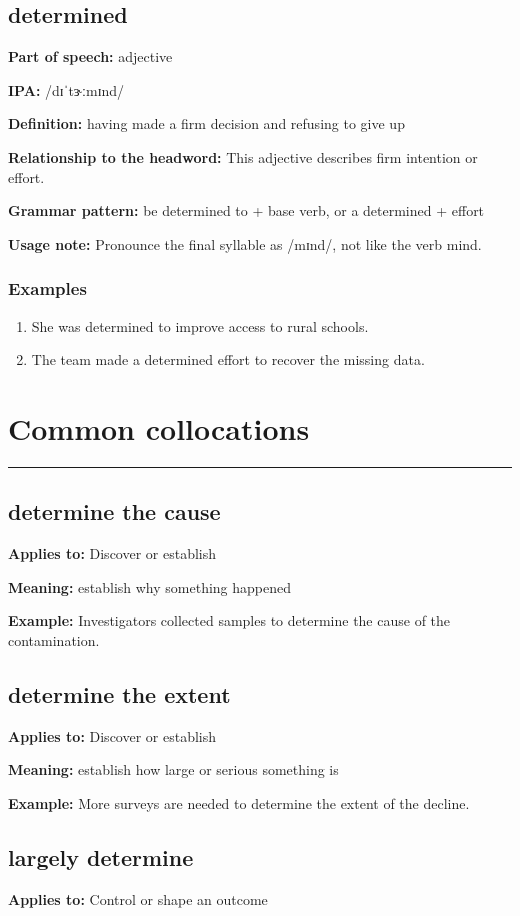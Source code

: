 \documentclass[11pt]{article}
\newcommand{\sectionrule}{\par\vspace{-0.5em}\noindent\textcolor{Accent}{\rule{\linewidth}{0.6pt}}\par}
\begin{document}
\subsection{determined}
\textbf{Part of speech:} adjective

\textbf{IPA:} /dɪˈtɝːmɪnd/

\textbf{Definition:} having made a firm decision and refusing to give up

\textbf{Relationship to the headword:} This adjective describes firm intention or effort.

\textbf{Grammar pattern:} be determined to + base verb, or a determined + effort

\textbf{Usage note:} Pronounce the final syllable as /mɪnd/, not like the verb mind.

\subsubsection{Examples}
\begin{enumerate}
  \item She was determined to improve access to rural schools.
  \item The team made a determined effort to recover the missing data.
\end{enumerate}

\section{Common collocations}
\sectionrule
\subsection{determine the cause}
\textbf{Applies to:} Discover or establish

\textbf{Meaning:} establish why something happened

\textbf{Example:} Investigators collected samples to determine the cause of the contamination.

\subsection{determine the extent}
\textbf{Applies to:} Discover or establish

\textbf{Meaning:} establish how large or serious something is

\textbf{Example:} More surveys are needed to determine the extent of the decline.

\subsection{largely determine}
\textbf{Applies to:} Control or shape an outcome
\end{document}
